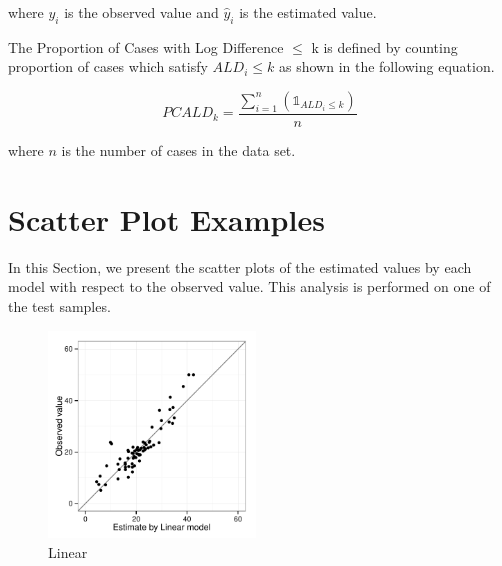 \documentclass[10pt, letterpaper ]{article}
\begin{document}
\noindent where $y_i$ is the observed value and $\hat{y}_i$ is the estimated value.

The Proportion of Cases with Log Difference $\le$ k is defined by counting proportion of cases which satisfy $ALD_i \le k$ as shown in the following equation. 

\begin{equation}
PCALD_k = \frac{ \sum_{i=1}^{n} \left( \mathds{1}_{ALD_i \le k} \right)}{ n }
\label{eq:logchange}
\end{equation}

\noindent where $n$ is the number of cases in the data set. 

\section{Scatter Plot Examples}

In this Section, we present the scatter plots of the estimated values by each model with respect to the observed value. This analysis is performed on one of the test samples.

\begin{figure}[H]
	\centering
	\includegraphics[width=0.49\textwidth]{figures/linear.pdf}
	\caption{Linear}
\end{figure}
\end{document}
